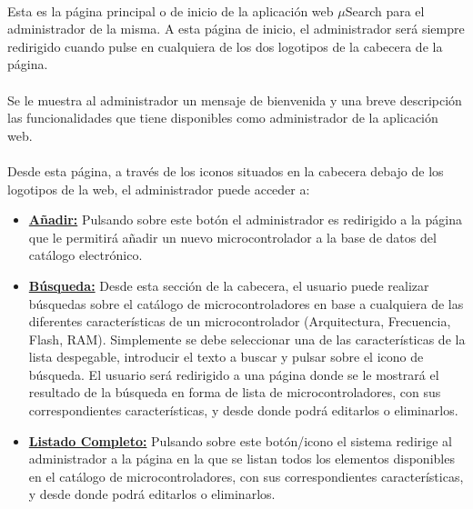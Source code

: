 \paragraph{}Esta es la página principal o de inicio de la aplicación web $\mu$Search para el administrador de la misma. A esta página de inicio, el administrador será siempre redirigido cuando pulse en cualquiera de los dos logotipos de la cabecera de la página.

\paragraph{}Se le muestra al administrador un mensaje de bienvenida y una breve descripción las funcionalidades que tiene disponibles como administrador de la aplicación web.

\paragraph{}Desde esta página, a través de los iconos situados en la cabecera debajo de los logotipos de la web, el administrador puede acceder a:
\begin{itemize}
	
	\item \underline{\textbf{Añadir:}} Pulsando sobre este botón el administrador es redirigido a la página que le permitirá añadir un nuevo microcontrolador a la base de datos del catálogo electrónico.
	
	\item \underline{\textbf{Búsqueda:}} Desde esta sección de la cabecera, el usuario puede realizar búsquedas sobre el catálogo de microcontroladores en base a cualquiera de las diferentes características de un microcontrolador (Arquitectura, Frecuencia, Flash, RAM). Simplemente se debe seleccionar una de las características de la lista despegable, introducir el texto a buscar y pulsar sobre el icono de búsqueda.
	El usuario será redirigido a una página donde se le mostrará el resultado de la búsqueda en forma de lista de microcontroladores, con sus correspondientes características, y desde donde podrá editarlos o eliminarlos.
	
	\item \underline{\textbf{Listado Completo:}} Pulsando sobre este botón/icono el sistema redirige al administrador a la página en la que se listan todos los elementos disponibles en el catálogo de microcontroladores, con sus correspondientes características, y desde donde podrá editarlos o eliminarlos.
	
\end{itemize}